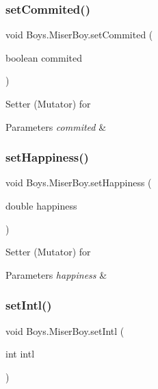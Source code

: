 \subsubsection{\texorpdfstring{set\+Commited()}{setCommited()}}
{\footnotesize\ttfamily void Boys.\+Miser\+Boy.\+set\+Commited (\begin{DoxyParamCaption}\item[{boolean}]{commited }\end{DoxyParamCaption})\hspace{0.3cm}{\ttfamily [inline]}}

Setter (Mutator) for 
\begin{DoxyParams}{Parameters}
{\em commited} & \\
\hline
\end{DoxyParams}
\mbox{\label{class_boys_1_1_miser_boy_a1bd22e3a7130262bcd8e14974e2eebcc}} 
\subsubsection{\texorpdfstring{set\+Happiness()}{setHappiness()}}
{\footnotesize\ttfamily void Boys.\+Miser\+Boy.\+set\+Happiness (\begin{DoxyParamCaption}\item[{double}]{happiness }\end{DoxyParamCaption})\hspace{0.3cm}{\ttfamily [inline]}}

Setter (Mutator) for 
\begin{DoxyParams}{Parameters}
{\em happiness} & \\
\hline
\end{DoxyParams}
\mbox{\label{class_boys_1_1_miser_boy_aaf56ca15493d927c56756b0de0bf440b}} 
\subsubsection{\texorpdfstring{set\+Intl()}{setIntl()}}
{\footnotesize\ttfamily void Boys.\+Miser\+Boy.\+set\+Intl (\begin{DoxyParamCaption}\item[{int}]{intl }\end{DoxyParamCaption})\hspace{0.3cm}{\ttfamily [inline]}}

